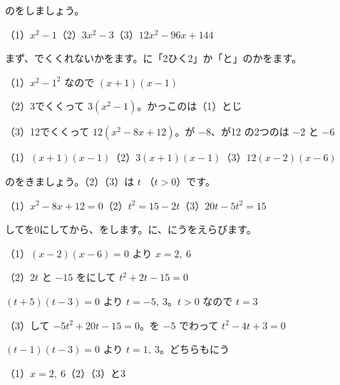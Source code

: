 \begin{reidai}
のをしましょう。\par（1）\nobreak $x^2-1$\quad（2）\nobreak $3x^2-3$\quad（3）\nobreak $12x^2-96x+144$\par
\kangaekata まず、でくくれないかをます。に「2ひく2」か「と」のかをます。\par
\shiki（1）\nobreak $x^2-1^2$ なので $(x+1)(x-1)$\par
\hspace*{2.6\zw}（2）\nobreak 3でくくって $3(x^2-1)$。かっこのは（1）とじ\par
\hspace*{2.6\zw}（3）\nobreak 12でくくって $12(x^2-8x+12)$。が $-8$、が12 の2つのは $-2$ と $-6$\par
\kotae（1）\nobreak $(x+1)(x-1)$\quad（2）\nobreak $3(x+1)(x-1)$\quad（3）\nobreak $12(x-2)(x-6)$
\end{reidai}

\begin{reidai}
のをきましょう。（2）（3）は $t$ （$t>0$）です。\par
（1）\nobreak $x^2-8x+12=0$\quad（2）\nobreak $t^2=15-2t$\quad（3）\nobreak $20t-5t^2=15$\par
\kangaekata {}してを0にしてから、をします。に、にうをえらびます。\par
\shiki（1）\nobreak $(x-2)(x-6)=0$ より $x=2,\ 6$\par
\hspace*{2.6\zw}（2）\nobreak $2t$ と $-15$ をにして $t^2+2t-15=0$\par
\hspace*{4.3\zw}$(t+5)(t-3)=0$ より $t=-5,\ 3$。$t>0$ なので $t=3$\par
\hspace*{2.6\zw}（3）\nobreak {}して $-5t^2+20t-15=0$。を $-5$ でわって $t^2-4t+3=0$\par
\hspace*{4.3\zw}$(t-1)(t-3)=0$ より $t=1,\ 3$。どちらもにう\par
\kotae（1）\nobreak $x=2,\ 6$\quad（2）\quad（3）と3
\end{reidai}

